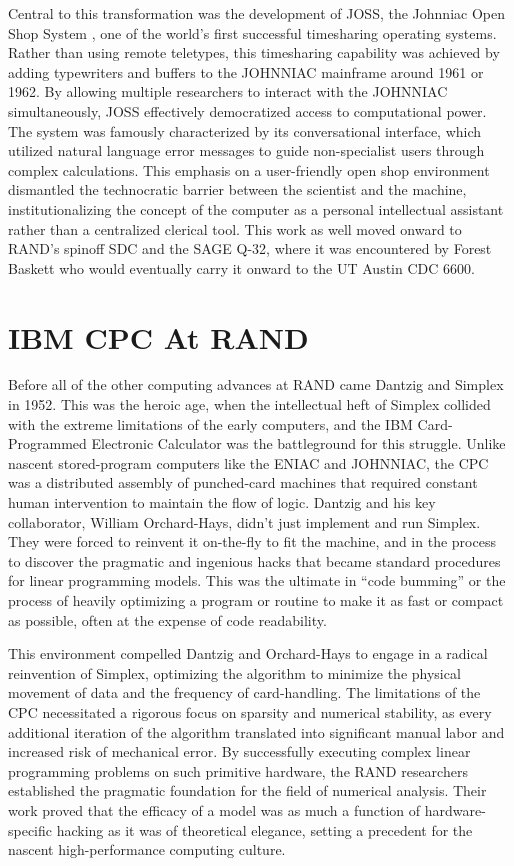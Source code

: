 Central to this transformation was the development of JOSS, the Johnniac Open Shop System , one of the world's first successful timesharing operating systems. Rather than using remote teletypes, this timesharing capability was achieved by adding typewriters and buffers to the JOHNNIAC mainframe around 1961 or 1962. By allowing multiple researchers to interact with the JOHNNIAC simultaneously, JOSS effectively democratized access to computational power. The system was famously characterized by its conversational interface, which utilized natural language error messages to guide non-specialist users through complex calculations. This emphasis on a user-friendly open shop environment dismantled the technocratic barrier between the scientist and the machine, institutionalizing the concept of the computer as a personal intellectual assistant rather than a centralized clerical tool. This work as well moved onward to RAND’s spinoff SDC and the SAGE Q-32, where it was encountered by Forest Baskett who would eventually carry it onward to the UT Austin CDC 6600.

\section{IBM CPC At RAND}

Before all of the other computing advances at RAND came Dantzig and Simplex in 1952. This was the heroic age, when the intellectual heft of Simplex collided with the extreme limitations of the early computers, and the IBM Card-Programmed Electronic Calculator was the battleground for this struggle. Unlike nascent stored-program computers like the ENIAC and JOHNNIAC, the CPC was a distributed assembly of punched-card machines that required constant human intervention to maintain the flow of logic. Dantzig and his key collaborator, William Orchard-Hays, didn't just implement and run Simplex. They were forced to reinvent it on-the-fly to fit the machine, and in the process to discover the pragmatic and ingenious hacks that became standard procedures for linear programming models. This was the ultimate in “code bumming” or the process of heavily optimizing a program or routine to make it as fast or compact as possible, often at the expense of code readability.

This environment compelled Dantzig and Orchard-Hays to engage in a radical reinvention of Simplex, optimizing the algorithm to minimize the physical movement of data and the frequency of card-handling. The limitations of the CPC necessitated a rigorous focus on sparsity and numerical stability, as every additional iteration of the algorithm translated into significant manual labor and increased risk of mechanical error. By successfully executing complex linear programming problems on such primitive hardware, the RAND researchers established the pragmatic foundation for the field of numerical analysis. Their work proved that the efficacy of a model was as much a function of hardware-specific hacking as it was of theoretical elegance, setting a precedent for the nascent high-performance computing culture.

